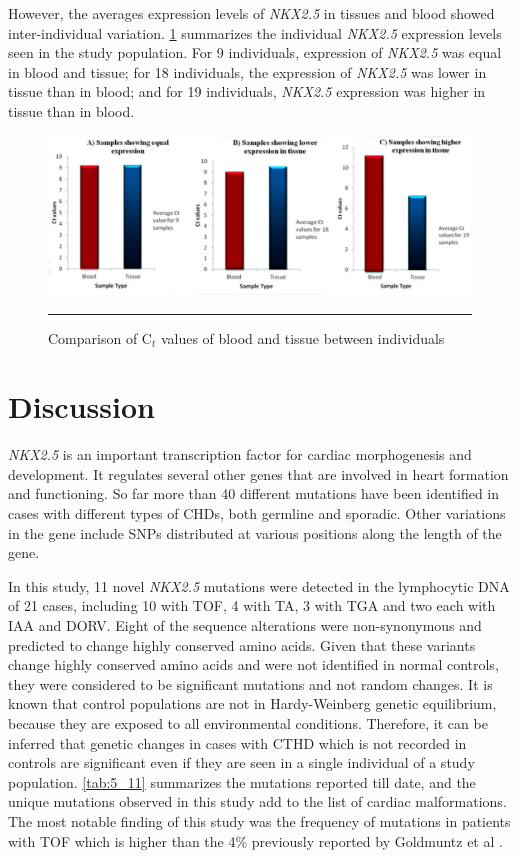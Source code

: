 \begin{refsection}
However, the averages expression levels of \textit{NKX2.5} in tissues and blood showed inter-individual variation. \cref{fig:5_13} summarizes the individual \textit{NKX2.5} expression levels seen in the study population. For 9 individuals, expression of \textit{NKX2.5} was equal in blood and tissue; for 18 individuals, the expression of \textit{NKX2.5} was lower in tissue than in blood; and for 19 individuals, \textit{NKX2.5} expression was higher in tissue than in blood.

\begin{figure}[!htb]
\centering
\includegraphics[width=\linewidth]{Figures/Figure5_13.pdf}
\rule{35em}{0.5pt}
\caption{Comparison of C$_t$ values of blood and tissue between individuals}
\label{fig:5_13}
\end{figure}

\section{Discussion}

\textit{NKX2.5} is an important transcription factor for cardiac morphogenesis and development. It regulates several other genes that are involved in heart formation and functioning. So far more than 40 different mutations have been identified in cases with different types of CHDs, both germline and sporadic. Other variations in the gene include SNPs distributed at various positions along the length of the gene. 

In this study, 11 novel \textit{NKX2.5} mutations were detected in the lymphocytic DNA of 21 cases, including 10 with TOF, 4 with TA, 3 with TGA and two each with IAA and DORV. Eight of the sequence alterations were non-synonymous and predicted to change highly conserved amino acids. Given that these variants change highly conserved amino acids and were not identified in normal controls, they were considered to be significant mutations and not random changes. It is known that control populations are not in Hardy-Weinberg genetic equilibrium, because they are exposed to all environmental conditions. Therefore, it can be inferred that genetic changes in cases with CTHD which is not recorded in controls are significant even if they are seen in a single individual of a study population. \cref{tab:5_11} summarizes the mutations reported till date, and the unique mutations observed in this study add to the list of cardiac malformations. The most notable finding of this study was the frequency of mutations in patients with TOF which is higher than the 4\% previously reported by Goldmuntz et al \cite{goldmuntz2001nkx2}.


\end{refsection}
